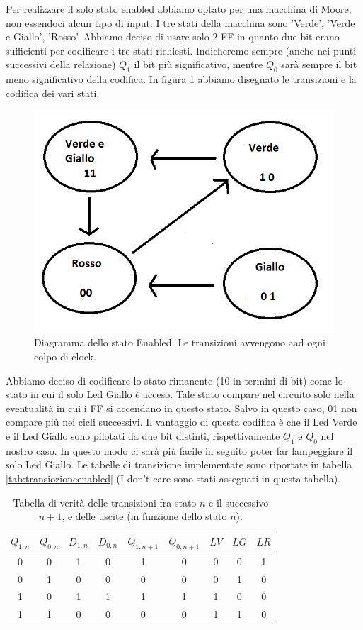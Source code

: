 \documentclass[10pt,a4paper]{article}
\begin{document}
Per realizzare il solo stato enabled abbiamo optato per una macchina di Moore, non essendoci alcun tipo di input. I tre stati della macchina sono 'Verde', 'Verde e Giallo', 'Rosso'. Abbiamo deciso di usare solo 2 FF in quanto due bit erano sufficienti per codificare i tre stati richiesti. Indicheremo sempre (anche nei punti successivi della relazione) $Q_1$ il bit più significativo, mentre $Q_0$ sarà sempre il bit meno significativo della codifica. In figura \ref{fig:FSMenabled} abbiamo disegnato le transizioni e la codifica dei vari stati.
\begin{figure}[!htb]
\centering
\includegraphics[scale=0.7]{FSMenabled.png}
\caption{Diagramma dello stato Enabled. Le transizioni avvengono aad ogni colpo di clock.\label{fig:FSMenabled}}
\end{figure}
Abbiamo deciso di codificare lo stato rimanente (10 in termini di bit) come lo stato in cui il solo Led Giallo è acceso. Tale stato compare nel circuito solo nella eventualità in cui i FF si accendano in questo stato. Salvo in questo caso, 01 non compare più nei cicli successivi.
Il vantaggio di questa codifica è che il Led Verde e il Led Giallo sono pilotati da due bit distinti, rispettivamente $Q_1$ e $Q_0$ nel nostro caso. In questo modo ci sarà più facile in seguito poter far lampeggiare il solo Led Giallo.
Le tabelle di transizione implementate sono riportate in tabella \ref{tab:transiozioneenabled} (I don't care sono stati assegnati in questa tabella).
\begin{table}[!htb]
\centering
\begin{tabular}{|c|c|c|c||c|c||c|c|c|}
\hline
$Q_{1,n}$ & $Q_{0,n}$ & $D_{1, n}$ & $D_{0, n}$& $Q_{1,n+1}$ & $Q_{0,n+1}$ & $LV$ & $LG$ & $LR$\\
\hline
0 & 0 & 1 & 0 & 1 & 0 & 0 & 0 & 1 \\
0 & 1 & 0 & 0 & 0 & 0 & 0 & 1 & 0\\
1 & 0 & 1 & 1 & 1 & 1 & 1 & 0 & 0\\
1 & 1 & 0 & 0 & 0 & 0 & 1 & 1 & 0\\
\hline
\end{tabular}
\caption{Tabella di verità delle transizioni fra stato $n$ e il successivo $n+1$, e delle uscite (in funzione dello stato $n$).\label{tab:transizioneenabled}}
\end{table}
\end{document}
